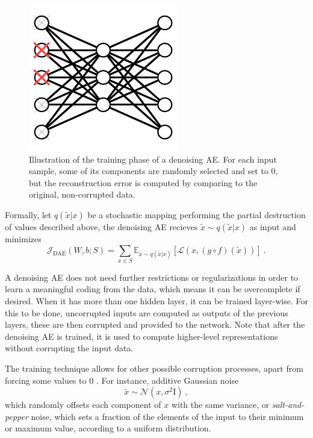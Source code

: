 \documentclass[preprint,5p,compress]{elsarticle}
\begin{document}
\begin{figure}[ht!]
	\centering
	\includegraphics[width=0.7\linewidth]{Denoising.pdf} 

	\caption{Illustration of the training phase of a denoising AE. For each input sample, some of its components are randomly selected and set to 0, but the reconstruction error is computed by comparing to the original, non-corrupted data.}
	\label{Fig.Denoising}
\end{figure}

Formally, let $q(\tilde x\vert x)$ be a stochastic mapping performing the partial destruction of values described above, the denoising AE recieves $\tilde x\sim q(\tilde x\vert x)$ as input and minimizes
\begin{equation}
  \mathcal J_{\mathrm{DAE}}(W,b;S)=\sum_{x\in S}\mathbb E_{\tilde x \sim q(\tilde x \vert x)} \left[\mathcal L(x, (g\circ f)(\tilde x))\right]~.
\end{equation}

A denoising AE does not need further restrictions or regularizations in order to learn a meaningful coding from the data, which means it can be overcomplete if desired. When it has more than one hidden layer, it can be trained layer-wise. For this to be done, uncorrupted inputs are computed as outputs of the previous layers, these are then corrupted and provided to the network. Note that after the denoising AE is trained, it is used to compute higher-level representations without corrupting the input data.

The training technique allows for other possible corruption processes, apart from forcing some values to 0 \cite{vincent2010stacked}. For instance, additive Gaussian noise
\begin{equation}
  \tilde x \sim \mathcal N(x, \sigma^2 \mathrm I)~,
\end{equation}
which randomly offsets each component of $x$ with the same variance, or \textit{salt-and-pepper} noise, which sets a fraction of the elements of the input to their minimum or maximum value, according to a uniform distribution.
\end{document}
